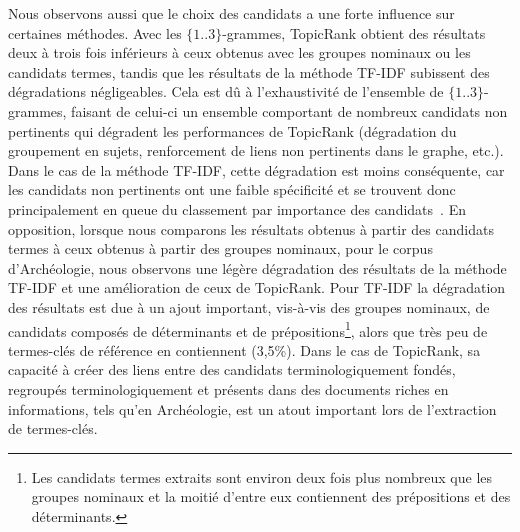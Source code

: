     Nous observons aussi que le choix des candidats a une forte influence sur
    certaines méthodes. Avec les $\{1..3\}$-grammes, TopicRank obtient des
    résultats deux à trois fois inférieurs à ceux obtenus avec les groupes
    nominaux ou les candidats termes, %
    tandis que les résultats de la méthode TF-IDF subissent des dégradations
    négligeables. Cela est dû à l'exhaustivité de l'ensemble de
    $\{1..3\}$-grammes, faisant de celui-ci un ensemble comportant de nombreux
    candidats non pertinents qui dégradent les performances de TopicRank
    (dégradation du groupement en sujets, renforcement de liens non pertinents
    dans le graphe, etc.). Dans le cas de la méthode TF-IDF, cette dégradation
    est moins conséquente, car les candidats non pertinents ont une faible
    spécificité et se trouvent donc principalement en queue du classement par
    importance des candidats~\cite{kim2009termextraction}. En opposition,
    lorsque nous comparons les résultats obtenus à partir des candidats termes
    à ceux obtenus à partir des groupes nominaux, pour le corpus d'Archéologie,
    nous observons une légère dégradation des résultats de la méthode TF-IDF et
    une amélioration de ceux de TopicRank. Pour TF-IDF la dégradation des
    résultats est due à un ajout important, vis-à-vis des groupes nominaux, de
    candidats composés de déterminants et de prépositions\footnote{Les candidats
    termes extraits sont environ deux fois plus nombreux que les groupes
    nominaux et la moitié d'entre eux contiennent des prépositions et des
    déterminants.}, alors que très peu de termes-clés de référence en
    contiennent (3,5\%). Dans le cas de TopicRank, sa capacité à créer des liens
    entre des candidats terminologiquement fondés, regroupés terminologiquement
    et présents dans des documents riches en informations, tels qu'en
    Archéologie, est un atout important lors de l'extraction de termes-clés.
